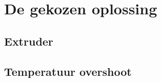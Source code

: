 \chapter{De gekozen oplossing}
\label{De_gekozen_oplossing}

\section{Extruder}




\section{Temperatuur overshoot}


